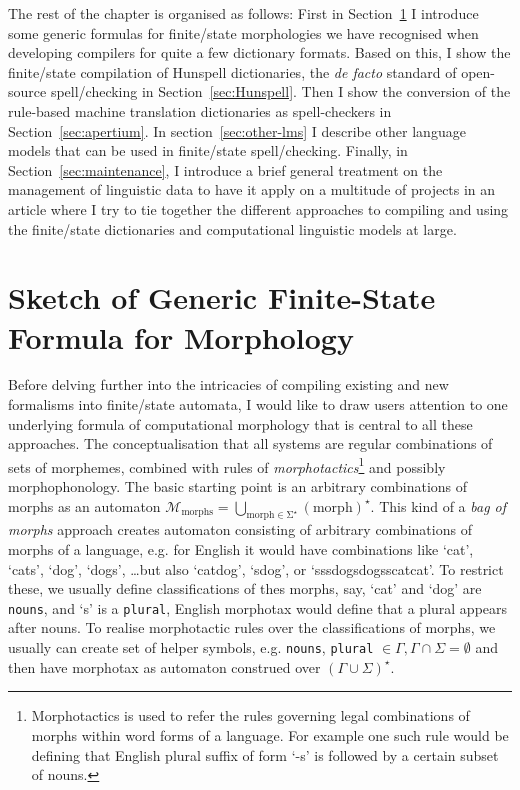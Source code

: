 \documentclass[officiallayout]{unihelcompling}
\begin{document}
The rest of the chapter is organised as follows: First in
Section~\ref{sec:generic} I introduce some generic formulas for finite\-/state
morphologies we have recognised when developing compilers for quite a few
dictionary formats. Based on this, I show the finite\-/state compilation of
Hunspell dictionaries, the \emph{de facto} standard of open-source spell\-/checking in
Section~\ref{sec:Hunspell}.  Then I show the conversion of the rule-based
machine translation dictionaries as spell-checkers in
Section~\ref{sec:apertium}. In section~\ref{sec:other-lms} I describe other
language models that can be used in finite\-/state spell\-/checking. Finally, in
Section~\ref{sec:maintenance}, I introduce a brief general treatment on the
management of linguistic data to have it apply on a multitude of projects in an
article where I try to tie together the different approaches to compiling and
using the finite\-/state dictionaries and computational linguistic models at
large.

\section{Sketch of Generic Finite-State Formula for Morphology}
\label{sec:generic}

Before delving further into the intricacies of compiling existing and new
formalisms into finite\-/state automata, I would like to draw users attention
to one underlying formula of computational morphology that is central to all
these approaches. The conceptualisation that all systems are regular
combinations of sets of morphemes, combined with rules of
\emph{morphotactics}\footnote{Morphotactics is used to refer the rules
    governing legal combinations of morphs within word forms of a language. For
example one such rule would be defining that English plural suffix of form `-s'
is followed by a certain subset of nouns.} and possibly morphophonology.  The
basic starting point is an arbitrary combinations of morphs as an automaton
$\mathcal{M}_{\mathrm{morphs}} = \bigcup_{\mathrm{morph \in \Sigma^\star}}
({\mathrm{morph}})^\star$.  This kind of a \emph{bag of morphs} approach
creates automaton consisting of arbitrary combinations of morphs of a language,
e.g. for English it would have combinations like `cat', `cats', `dog', `dogs',
\ldots but also `catdog', `sdog', or `sssdogsdogsscatcat'. To restrict these,
we usually define classifications of thes morphs, say, `cat' and `dog' are
\texttt{nouns}, and `s' is a \texttt{plural}, English morphotax would define
that a plural appears after nouns. To realise morphotactic rules over the
classifications of morphs, we usually can create set of helper symbols, e.g.
{\texttt{nouns}, \texttt{plural}} $\in \Gamma, \Gamma \cap \Sigma = \emptyset$
and then have morphotax as automaton construed over $(\Gamma \cup
\Sigma)^\star$.
\end{document}
